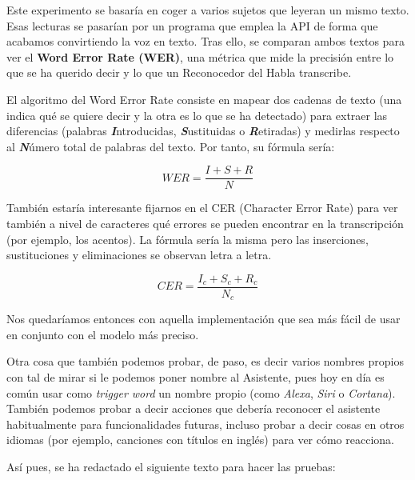 Este experimento se basaría en coger a varios sujetos que leyeran un mismo texto.
Esas lecturas se pasarían por un programa que emplea la API de forma que acabamos convirtiendo la voz en texto. Tras ello, se comparan ambos textos para ver el \textbf{Word Error Rate (WER)}, una métrica que mide la precisión entre lo que se ha querido decir y lo que un Reconocedor del Habla transcribe. 

El algoritmo del Word Error Rate consiste en mapear dos cadenas de texto (una indica qué se quiere decir y la otra es lo que se ha detectado) para extraer las diferencias (palabras \textbf{\textit{I}}ntroducidas, \textbf{\textit{S}}ustituidas o \textbf{\textit{R}}etiradas)  y medirlas respecto al \textbf{\textit{N}}úmero total de palabras del texto. Por tanto, su fórmula sería:

\begin{equation}
	WER = \frac{I+S+R}{N}
\end{equation}

También estaría interesante fijarnos en el CER (Character Error Rate) para ver también a nivel de caracteres qué errores se pueden encontrar en la transcripción (por ejemplo, los acentos). La fórmula sería la misma pero las inserciones, sustituciones y eliminaciones se observan letra a letra.

\begin{equation}
	CER = \frac{I_c+S_c+R_c}{N_c}
\end{equation}

Nos quedaríamos entonces con aquella implementación que sea más fácil de usar en conjunto con el modelo más preciso. 

Otra cosa que también podemos probar, de paso, es decir varios nombres propios con tal de mirar si le podemos poner nombre al Asistente, pues hoy en día es común usar como \textit{trigger word} un nombre propio (como \textit{Alexa}, \textit{Siri} o \textit{Cortana}). También podemos probar a decir acciones que debería reconocer el asistente habitualmente para funcionalidades futuras, incluso probar a decir cosas en otros idiomas (por ejemplo, canciones con títulos en inglés) para ver cómo reacciona.

Así pues, se ha redactado el siguiente texto para hacer las pruebas:

